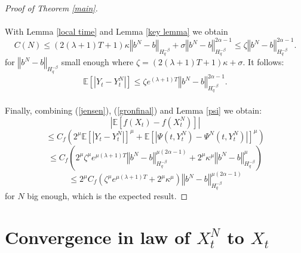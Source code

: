 \documentclass[11pt]{enstaPRE}
\newcommand{\norme}[1]{\left\Vert #1\right\Vert}
\newcommand{\E}{\mathbb{E}}
\begin{document}
\begin{proof}[Proof of Theorem \ref{main}]
    \paragraph{}
    With Lemma \ref{local time} and Lemma \ref{key lemma} we obtain \begin{equation*}
    C(N) \leq (2(\lambda + 1)T+1)\kappa\norme{b^N-b}_{H^{-\beta}_{q}}   + \sigma\norme{b^N-b}_{H^{-\beta}_{q}}^{2\alpha-1} \leq \zeta \norme{b^N-b}_{H^{-\beta}_{q}}^{2\alpha-1}.
    \end{equation*}   
    for $\norme{b^N-b}_{H^{-\beta}_{q}}$ small enough where $\zeta = (2(\lambda + 1)T+1)\kappa + \sigma $. It follows:
    \begin{equation}\label{gronfinal}
    \E\left[\left|Y_t-Y_t^N\right|\right] \leq \zeta e^{(\lambda + 1)T} \norme{b^N-b}_{H^{-\beta}_{q}}^{2\alpha-1}.
    \end{equation}
    
    \paragraph{}
    Finally, combining (\ref{jensen}), (\ref{gronfinal}) and Lemma \ref{psi} we obtain:    
    \begin{equation*}
    \left|\E\left[f\left(X_t\right)-f\left(X_t^N\right)\right]\right| 
    \end{equation*}
    \begin{equation*}
    \leq C_f  \left(2^\mu\E\left[\left|Y_t-Y_t^N\right|\right]^\mu+\E\left[\left|\Psi\left(t,Y_t^N\right)-\Psi^N\left(t,Y_t^N\right)\right|\right]^\mu\right)
    \end{equation*} 
    \begin{equation*}
    \leq C_f  \left(2^\mu\zeta^\mu e^{\mu(\lambda+1)T} \norme{b^N-b}_{H^{-\beta}_{q}}^{\mu(2\alpha-1)} + 2^\mu \kappa^\mu \norme{b^N-b}_{H^{-\beta}_q}^\mu\right)
    \end{equation*}
    \begin{equation*}
    \leq 2^\mu C_f  \left(\zeta^\mu e^{\mu(\lambda+1)T} + 2^\mu \kappa^\mu\right)\norme{b^N-b}_{H^{-\beta}_{q}}^{\mu(2\alpha-1)}
    \end{equation*}       
    for $N$ big enough, which is the expected result.    
\end{proof}   


\section{Convergence in law of $X^N_t$ to $X_t$}
\end{document}
